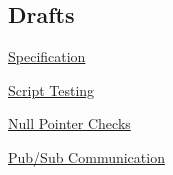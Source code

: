\subsection*{Drafts}


\begin{DoxyItemize}
\item \hyperlink{doc_decisions_specification_md}{Specification}
\item \hyperlink{doc_decisions_script_testing_md}{Script Testing}
\item \hyperlink{doc_decisions_null_pointer_checks_md}{Null Pointer Checks}
\item \hyperlink{doc_decisions_pubsub_md}{Pub/\+Sub Communication} 
\end{DoxyItemize}